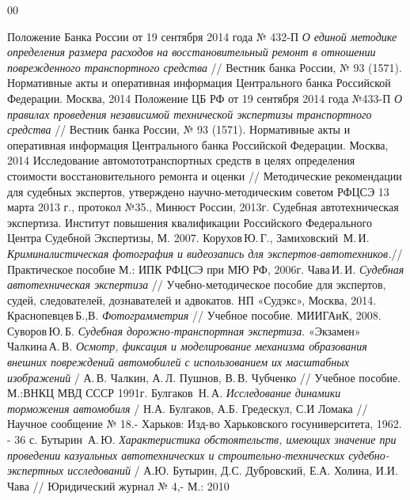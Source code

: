 \begin {thebibliography}{00} 


Положение Банка России от 19 сентября 2014 года № 432-П \emph{О единой методике определения размера расходов на восстановительный ремонт в отношении поврежденного транспортного средства} // Вестник банка России, № 93 (1571). Нормативные акты и оперативная информация
Центрального банка Российской Федерации. Москва, 2014
Положение ЦБ РФ от 19 сентября 2014 года №433-П \emph{О правилах проведения независимой технической экспертизы транспортного средства} // Вестник банка России, № 93 (1571). Нормативные акты и оперативная информация Центрального банка Российской Федерации. Москва, 2014
Исследование автомототранспортных средств в целях определения стоимости восстановительного ремонта и оценки // Методические рекомендации для судебных экспертов, утверждено  научно-методическим советом РФЦСЭ 13 марта 2013 г., протокол №35., Минюст России, 2013г.
Судебная автотехническая экспертиза. Институт повышения квалификации Российского Федерального Центра Судебной Экспертизы, М. 2007.
Корухов\,Ю.\,Г., Замиховский\, М.\,И. \emph {Криминалистическая фотография и видеозапись для экспертов-автотехников.}// Практическое пособие М.: ИПК РФЦСЭ при МЮ РФ, 2006г.
Чава\,И.\,И. \emph {Судебная автотехническая экспертиза} // Учебно-методическое пособие для  экспертов,    судей, следователей, дознавателей и адвокатов. НП «Судэкс», Москва, 2014.
Краснопевцев\,Б.,В. \emph{Фотограмметрия} // Учебное пособие. МИИГАиК, 2008.
Суворов\,Ю.\,Б. \emph{Судебная дорожно-транспортная экспертиза}. «Экзамен»
Чалкина\,А.\,В.  \emph{Осмотр, фиксация и моделирование механизма образования внешних повреждений автомобилей с использованием их масштабных изображений} / А.\,В. Чалкин, А.\,Л. Пушнов, В.\,В. Чубченко // Учебное пособие.  М.:ВНКЦ МВД СССР 1991г.
Булгаков \,Н.\,А.  \emph{Исследование динамики торможения автомобиля} / Н.А. Булгаков, А.Б. Гредескул, С.И Ломака // Научное сообщение № 18.- Харьков: Изд-во Харьковского госуниверситета, 1962. - 36 с.
Бутырин\, А.\,Ю. \emph{Характеристика обстоятельств, имеющих значение при проведении казуальных автотехнических и строительно-технических судебно-экспертных исследований} / А.Ю. Бутырин, Д.С. Дубровский, Е.А. Холина, И.И. Чава // Юридический журнал № 4,- М.:  2010

\end{thebibliography}
